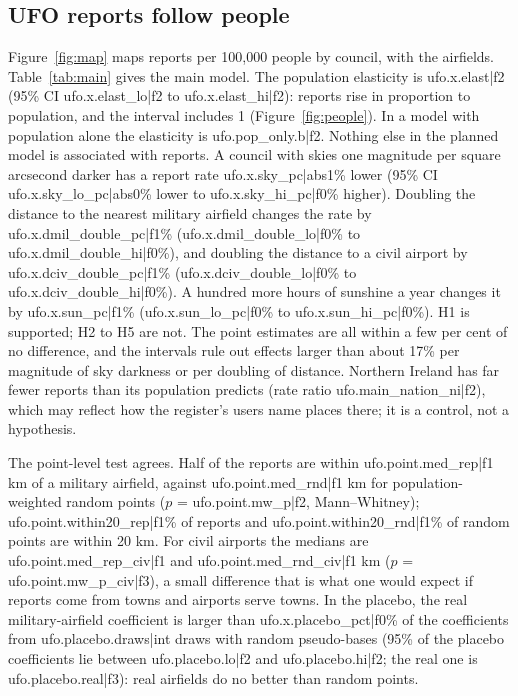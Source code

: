 \documentclass[11pt,a4paper]{article}
\begin{document}
\subsection{UFO reports follow people}
Figure~\ref{fig:map} maps reports per 100,000 people by council, with the airfields. Table~\ref{tab:main} gives the main model. The population elasticity is {{ufo.x.elast|f2}} (95\% CI {{ufo.x.elast_lo|f2}} to {{ufo.x.elast_hi|f2}}): reports rise in proportion to population, and the interval includes 1 (Figure~\ref{fig:people}). In a model with population alone the elasticity is {{ufo.pop_only.b|f2}}. Nothing else in the planned model is associated with reports. A council with skies one magnitude per square arcsecond darker has a report rate {{ufo.x.sky_pc|abs1}}\% lower (95\% CI {{ufo.x.sky_lo_pc|abs0}}\% lower to {{ufo.x.sky_hi_pc|f0}}\% higher). Doubling the distance to the nearest military airfield changes the rate by {{ufo.x.dmil_double_pc|f1}}\% ({{ufo.x.dmil_double_lo|f0}}\% to {{ufo.x.dmil_double_hi|f0}}\%), and doubling the distance to a civil airport by {{ufo.x.dciv_double_pc|f1}}\% ({{ufo.x.dciv_double_lo|f0}}\% to {{ufo.x.dciv_double_hi|f0}}\%). A hundred more hours of sunshine a year changes it by {{ufo.x.sun_pc|f1}}\% ({{ufo.x.sun_lo_pc|f0}}\% to {{ufo.x.sun_hi_pc|f0}}\%). H1 is supported; H2 to H5 are not. The point estimates are all within a few per cent of no difference, and the intervals rule out effects larger than about 17\% per magnitude of sky darkness or per doubling of distance. Northern Ireland has far fewer reports than its population predicts (rate ratio {{ufo.main_nation_ni|f2}}), which may reflect how the register's users name places there; it is a control, not a hypothesis.

The point-level test agrees. Half of the reports are within {{ufo.point.med_rep|f1}} km of a military airfield, against {{ufo.point.med_rnd|f1}} km for population-weighted random points ($p$ = {{ufo.point.mw_p|f2}}, Mann--Whitney); {{ufo.point.within20_rep|f1}}\% of reports and {{ufo.point.within20_rnd|f1}}\% of random points are within 20 km. For civil airports the medians are {{ufo.point.med_rep_civ|f1}} and {{ufo.point.med_rnd_civ|f1}} km ($p$ = {{ufo.point.mw_p_civ|f3}}), a small difference that is what one would expect if reports come from towns and airports serve towns. In the placebo, the real military-airfield coefficient is larger than {{ufo.x.placebo_pct|f0}}\% of the coefficients from {{ufo.placebo.draws|int}} draws with random pseudo-bases (95\% of the placebo coefficients lie between {{ufo.placebo.lo|f2}} and {{ufo.placebo.hi|f2}}; the real one is {{ufo.placebo.real|f3}}): real airfields do no better than random points.
\end{document}
